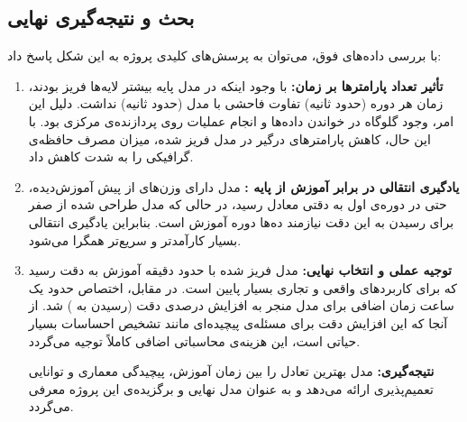 \subsection{بحث و نتیجه‌گیری نهایی }
با بررسی داده‌های فوق، می‌توان به پرسش‌های کلیدی پروژه به این شکل پاسخ داد:
\begin{enumerate}
    \item \textbf{تأثیر تعداد پارامترها بر زمان:} با وجود اینکه در مدل پایه بیشتر لایه‌ها فریز بودند، زمان هر دوره (حدود  ثانیه) تفاوت فاحشی با مدل  (حدود  ثانیه) نداشت. دلیل این امر، وجود گلوگاه  در خواندن داده‌ها و انجام عملیات  روی پردازنده‌ی مرکزی  بود. با این حال، کاهش پارامترهای درگیر در مدل فریز شده، میزان مصرف حافظه‌ی گرافیکی  را به شدت کاهش داد.
    \item \textbf{یادگیری انتقالی در برابر آموزش از پایه :} مدل دارای وزن‌های از پیش آموزش‌دیده، حتی در دوره‌ی اول به دقتی معادل  رسید، در حالی که مدل طراحی شده از صفر  برای رسیدن به این دقت نیازمند ده‌ها دوره آموزش است. بنابراین یادگیری انتقالی بسیار کارآمدتر و سریع‌تر همگرا می‌شود.
    \item \textbf{توجیه عملی و انتخاب نهایی:} مدل فریز شده با حدود  دقیقه آموزش به دقت  رسید که برای کاربردهای واقعی و تجاری بسیار پایین است. در مقابل، اختصاص حدود یک ساعت زمان اضافی برای مدل  منجر به افزایش  درصدی دقت (رسیدن به ) شد. از آنجا که این افزایش دقت برای مسئله‌ی پیچیده‌ای مانند تشخیص احساسات بسیار حیاتی است، این هزینه‌ی محاسباتی اضافی کاملاً توجیه می‌گردد. 
    
    \textbf{نتیجه‌گیری:} مدل  بهترین تعادل را بین زمان آموزش، پیچیدگی معماری و توانایی تعمیم‌پذیری ارائه می‌دهد و به عنوان مدل نهایی و برگزیده‌ی این پروژه معرفی می‌گردد.
\end{enumerate}